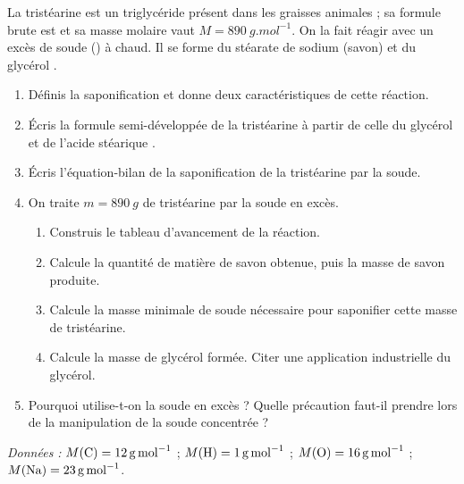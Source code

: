 \documentclass[11pt]{article}
\begin{document}
\begin{exercice}
La tristéarine est un triglycéride présent dans les graisses animales ; sa formule brute est  et sa masse molaire vaut $M = \SI{890}{g.mol^{-1}}$. On la fait réagir avec un excès de soude () à chaud. Il se forme du stéarate de sodium  (savon) et du glycérol .
\begin{enumerate}
\item Définis la saponification et donne deux caractéristiques de cette réaction.
\item Écris la formule semi-développée de la tristéarine à partir de celle du glycérol et de l'acide stéarique .
\item Écris l'équation-bilan de la saponification de la tristéarine par la soude.
\item On traite $m = \SI{890}{g}$ de tristéarine par la soude en excès.
\begin{enumerate}
\item[a)] Construis le tableau d'avancement de la réaction.
\item[b)] Calcule la quantité de matière de savon obtenue, puis la masse de savon produite.
\item[c)] Calcule la masse minimale de soude nécessaire pour saponifier cette masse de tristéarine.
\item[d)] Calcule la masse de glycérol formée. Citer une application industrielle du glycérol.
\end{enumerate}
\item Pourquoi utilise-t-on la soude en excès ? Quelle précaution faut-il prendre lors de la manipulation de la soude concentrée ?
\end{enumerate}
\emph{Données :} $M(\ce{C}) = \SI{12}{g.mol^{-1}}$ ; $M(\ce{H}) = \SI{1}{g.mol^{-1}}$ ; $M(\ce{O}) = \SI{16}{g.mol^{-1}}$ ; $M(\ce{Na}) = \SI{23}{g.mol^{-1}}$.
\end{exercice}
\end{document}
